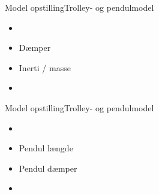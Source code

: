 \begin{frame}{Model opstilling}{Trolley- og pendulmodel}
  \begin{minipage}[t]{0.48\linewidth}
    \begin{itemize}
      	\item<1->[] {
              \begin{figure}[H]
              \centering
              
              \end{figure}}  
        \item<2-> Dæmper 
        \item<2-> Inerti / masse       
    \end{itemize}           
  \end{minipage}
  \begin{minipage}[t]{0.48\linewidth} 
    \begin{itemize}            
	\item<3->[] {
              \begin{figure}[H]
              \centering
              
              \end{figure}}	     	
    \end{itemize}           
  \end{minipage}
\end{frame} 

\begin{frame}{Model opstilling}{Trolley- og pendulmodel}
  \begin{minipage}[t]{0.48\linewidth}
    \begin{itemize}
      	\item<1->[] {
              \begin{figure}[H]
              \centering
              
              \end{figure}} 
        \item<2-> Pendul længde 
        \item<2-> Pendul dæmper        
    \end{itemize}           
  \end{minipage}
  \begin{minipage}[t]{0.48\linewidth} 
    \begin{itemize}            
	\item<3->[] {
              \begin{figure}[H]
              \centering
              
              \end{figure}}	     	
    \end{itemize}           
  \end{minipage}
\end{frame} 

